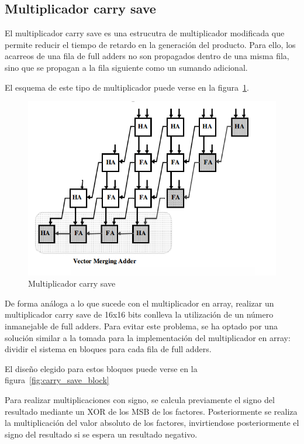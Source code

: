 \documentclass[a4paper,12pt]{article}
\begin{document}
\clearpage
\subsection{Multiplicador carry save}
El multiplicador carry save es una estrucutra de multiplicador modificada que permite reducir el tiempo de retardo en la generación del producto. Para ello, los acarreos de una fila de full adders no son propagados dentro de una misma fila, sino que se propagan a la fila siguiente como un sumando adicional.

El esquema de este tipo de multiplicador puede verse en la figura~\ref{fig:carry_save_multiplier}.

\begin{figure}[hbt]
\includegraphics[width=\textwidth]{img/carry_save_mult.png} 
\caption{Multiplicador carry save} \label{fig:carry_save_multiplier}
\end{figure}

De forma análoga a lo que sucede con el multiplicador en array, realizar un multiplicador carry save de 16x16 bits conlleva la utilización de un número inmanejable de full adders. Para evitar este problema, se ha optado por una solución similar a la tomada para la implementación del multiplicador en array: dividir el sistema en bloques para cada fila de full adders.

El diseño elegido para estos bloques puede verse en la figura~\ref{fig:carry_save_block}

Para realizar multiplicaciones con signo, se calcula previamente el signo del resultado mediante un XOR de los MSB de los factores. Posteriormente se realiza la multiplicación del valor absoluto de los factores, invirtiendose posteriormente el signo del resultado si se espera un resultado negativo.
\end{document}
